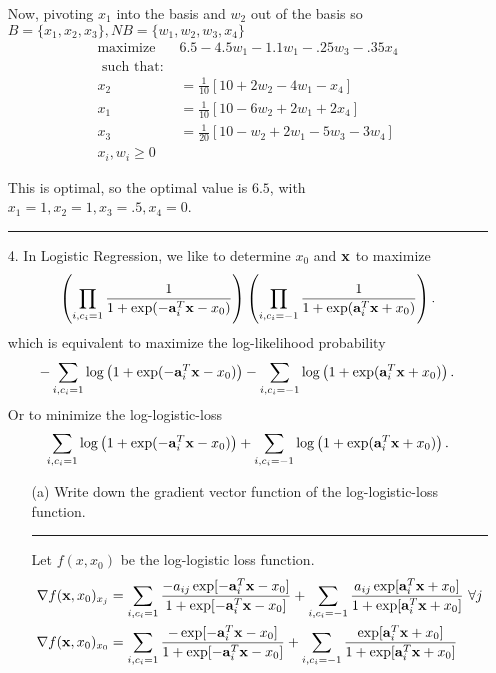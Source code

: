 \documentclass{article} %
\renewcommand\a{{\bf a}}
\newcommand\x{{\bf x}}
\begin{document}
\begin{enumerate}
Now, pivoting $x_1$ into the basis and $w_2$ out of the basis so $B= \{x_1, x_2, x_3 \}, NB = \{w_1, w_2, w_3, x_4\}$
\begin{equation*}
\begin{aligned}
\mbox{maximize } & 6.5  - 4.5 w_1 - 1.1w_1 - .25 w_3 - .35 x_4 \\ 
\mbox{ such that: } & \\ 
x_2 &= \frac{1}{10}[ 10 + 2 w_2 -  4 w_1 -  x_4] \\ 
x_1 &= \frac{1}{10} [10  - 6 w_2 + 2 w_1  + 2x_4]  \\ 
x_3 &= \frac{1}{20} [10 - w_2 + 2 w_1  - 5 w_3 -  3 w_4]  \\ 
x_i, w_i \geq 0
\end{aligned}
\end{equation*}

This is optimal, so the optimal value is $6.5$, with $x_1 = 1, x_2 = 1, x_3 = .5, x_4 = 0$. 



\rule{\textwidth}{1pt}





\item[4.] In Logistic Regression, we like to determine $x_0$ and $\x$ to maximize
\[
\left(\prod_{i,c_i=1}\frac{1}{1+\exp(-\a_i^T\x-x_0)}\right)
\left(\prod_{i,c_i=-1}\frac{1}{1+\exp(\a_i^T\x+x_0)}\right).
\]
which is equivalent to maximize the log-likelihood probability
\[
-\sum_{i,c_i=1}\log\left(1+\exp(-\a_i^T\x-x_0)\right)-\sum_{i,c_i=-1}\log\left(1+\exp(\a_i^T\x+x_0)\right).
\]
Or to minimize the log-logistic-loss
\[
\sum_{i,c_i=1}\log\left(1+\exp(-\a_i^T\x-x_0)\right)+\sum_{i,c_i=-1}\log\left(1+\exp(\a_i^T\x+x_0)\right).
\]
\begin{enumerate}
\item[(a)] Write down the gradient vector function of the log-logistic-loss function.

\rule{\textwidth}{1pt}

Let $f(x,x_0)$ be the log-logistic loss function. 
\begin{equation*}
\begin{aligned}
\nabla f(\x,x_0)_{x_j} &= \sum_{i,c_i = 1} \frac{-a_{ij} \exp[ -\a_i^T \x - x_0 ]}{ 1 + \exp[ -\a_i^T \x - x_0 ]} + \sum_{i, c_i = -1} \frac{a_{ij} \exp[ \a_i^T \x + x_0 ]}{ 1 + \exp[ \a_i^T \x + x_0 ]}  \mbox{  } \forall j \\
\nabla f(\x,x_0)_{x_0} &= \sum_{i,c_i = 1} \frac{- \exp[ -\a_i^T \x - x_0 ]}{ 1 + \exp[ -\a_i^T \x - x_0 ]} + \sum_{i, c_i = -1} \frac{ \exp[ \a_i^T \x + x_0 ]}{ 1 + \exp[ \a_i^T \x + x_0 ]} \\  
\end{aligned}
\end{equation*}



\end{enumerate}
\end{enumerate}
\end{document}

